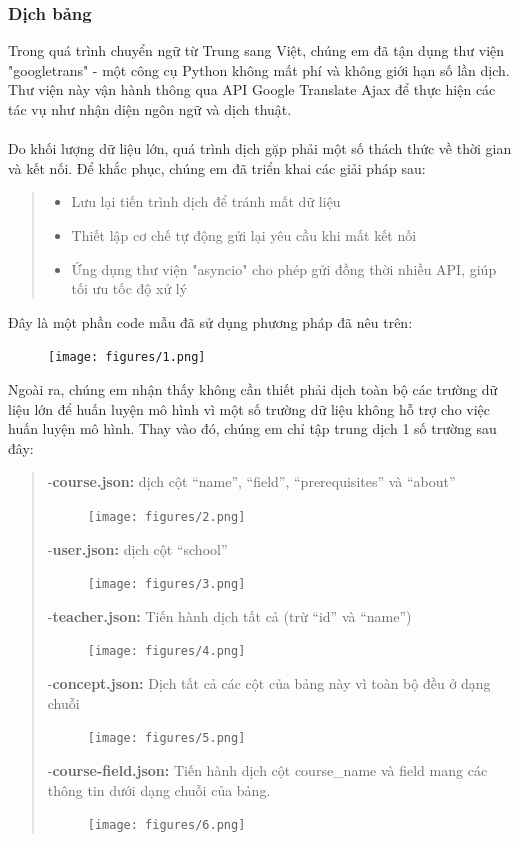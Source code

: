 \subsubsection{Dịch bảng}
Trong quá trình chuyển ngữ từ Trung sang Việt, chúng em đã tận dụng thư viện "googletrans" - một công cụ Python không mất phí và không giới hạn số lần dịch. Thư viện này vận hành thông qua API Google Translate Ajax để thực hiện các tác vụ như nhận diện ngôn ngữ và dịch thuật.\\
\\
Do khối lượng dữ liệu lớn, quá trình dịch gặp phải một số thách thức về thời gian và kết nối. Để khắc phục, chúng em đã triển khai các giải pháp sau:
\begin{quote}
\begin{itemize}
    \item Lưu lại tiến trình dịch để tránh mất dữ liệu
    \item Thiết lập cơ chế tự động gửi lại yêu cầu khi mất kết nối
    \item Ứng dụng thư viện "asyncio" cho phép gửi đồng thời nhiều API, giúp tối ưu tốc độ xử lý
\end{itemize}
\end{quote}
Đây là một phần code mẫu đã sử dụng phương pháp đã nêu trên:\\
\begin{figure}[H]
    \centering
    \texttt{[image: figures/1.png]}
\end{figure}
\newpage
Ngoài ra, chúng em nhận thấy không cần thiết phải dịch toàn bộ các trường dữ liệu lớn để huấn luyện mô hình vì một số trường dữ liệu không hỗ trợ cho việc huấn luyện mô hình. Thay vào đó, chúng em chỉ tập trung dịch 1 số trường sau đây:
\begin{quote}
-\textbf{course.json:} dịch cột “name”, “field”, “prerequisites” và “about”\\
\begin{figure}[H]
    \centering
    \texttt{[image: figures/2.png]}
\end{figure}
-\textbf{user.json:} dịch cột “school”
\begin{figure}[H]
    \centering
    \texttt{[image: figures/3.png]}
\end{figure}
\newpage
-\textbf{teacher.json:} Tiến hành dịch tất cả (trừ “id” và “name”)\\
\begin{figure}[H]
    \centering
    \texttt{[image: figures/4.png]}
\end{figure}
-\textbf{concept.json:} Dịch tất cả các cột của bảng này vì toàn bộ đều ở dạng chuỗi
\begin{figure}[H]
    \centering
    \texttt{[image: figures/5.png]}
\end{figure}
-\textbf{course-field.json:} Tiến hành dịch cột course\_name và field mang các thông tin dưới dạng chuỗi của bảng.
\begin{figure}[H]
    \centering
    \texttt{[image: figures/6.png]}
\end{figure}
\end{quote}
